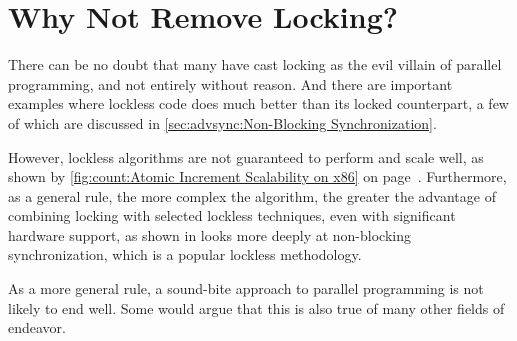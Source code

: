 
\section{Why Not Remove Locking?}
\label{sec:app:questions:Why Not Remove Locking?}

There can be no doubt that many have cast locking as the evil villain
of parallel programming, and not entirely without reason.
And there are important examples where lockless code does much better
than its locked counterpart, a few of which are discussed in
\cref{sec:advsync:Non-Blocking Synchronization}.

However, lockless algorithms are not guaranteed to perform and scale
well, as shown by
\cref{fig:count:Atomic Increment Scalability on x86} on
page~\pageref{fig:count:Atomic Increment Scalability on x86}.
Furthermore, as a general rule, the more complex the algorithm,
the greater the advantage of combining locking with selected
lockless techniques, even with significant hardware support,
as shown in
looks more deeply at non-blocking synchronization, which is a popular
lockless methodology.

As a more general rule, a sound-bite approach to parallel programming
is not likely to end well.
Some would argue that this is also true of many other fields of endeavor.
